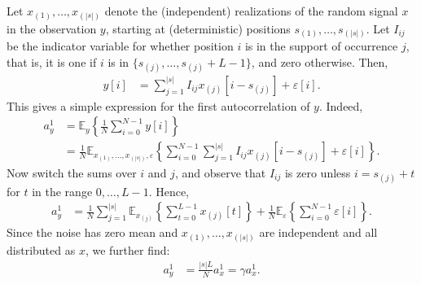 \documentclass[12pt]{article}
\newcommand{\E}{\mathbb{E}}
\newcommand{\1}{\mathbf{1}}
\theoremstyle{plain}
\theoremstyle{definition}
\theoremstyle{remark}
\theoremstyle{plain}
\theoremstyle{remark}
\theoremstyle{plain}
\theoremstyle{plain}
\theoremstyle{plain}
\numberwithin{equation}{section}
\begin{document}
Let $x_{(1)}, \ldots, x_{(|s|)}$ denote the (independent) realizations of the random signal $x$ in the observation $y$, starting at (deterministic) positions $s_{(1)}, \ldots, s_{(|s|)}$. Let $I_{ij}$ be the indicator variable for whether position $i$ is in the support of occurrence $j$, that is, it is one if $i$ is in $\{s_{(j)}, \ldots, s_{(j)}+L-1\}$, and zero otherwise. Then,
\begin{align}
y[i] & = \sum_{j = 1}^{|s|} I_{ij} x_{(j)}[i-s_{(j)}] + \varepsilon[i].
\label{eq:explicityiindicators}
\end{align}
This gives a simple expression for the first autocorrelation of $y$. Indeed,
\begin{align}
a_y^1 & = \E_y\left\{ \frac{1}{N} \sum_{i = 0}^{N-1} y[i] \right\} \\
& = \frac{1}{N} \E_{x_{(1)}, \ldots, x_{(|s|)}, \varepsilon}\left\{ \sum_{i = 0}^{N-1} \sum_{j = 1}^{|s|} I_{ij} x_{(j)}[i-s_{(j)}] + \varepsilon[i] \right\}.
\end{align}
Now switch the sums over $i$ and $j$, and observe that $I_{ij}$ is zero unless $i = s_{(j)} + t$ for $t$ in the range $0, \ldots, L-1$. Hence,
\begin{align}
a_y^1 & = \frac{1}{N} \sum_{j = 1}^{|s|} \E_{x_{(j)}}\left\{ \sum_{t = 0}^{L-1} x_{(j)}[t]\right\} + \frac{1}{N} \E_\varepsilon\left\{ \sum_{i=0}^{N-1} \varepsilon[i]\right\}.
\end{align}
Since the noise has zero mean and $x_{(1)}, \ldots, x_{(|s|)}$ are independent and all distributed as $x$, we further find:
\begin{align}
a_y^1 & = \frac{|s|L}{N} a_x^1 = \gamma a_x^1.
\end{align}
\end{document}
